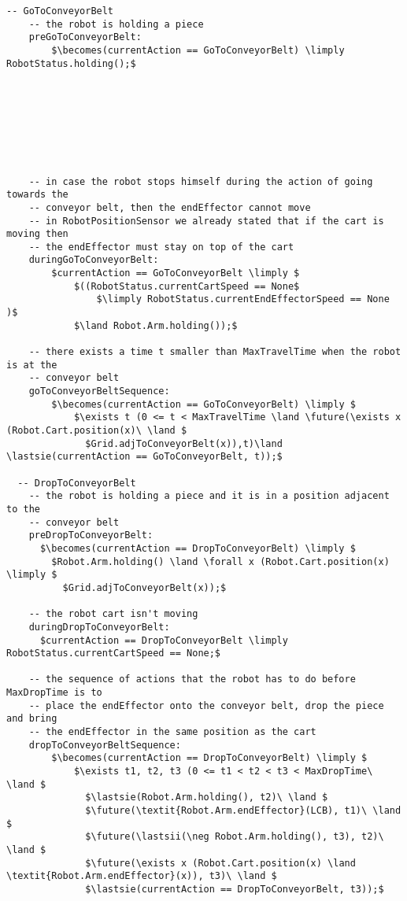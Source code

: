 \begin{lstlisting}[fontadjust, mathescape, frame=single]
  -- GoToConveyorBelt
    -- the robot is holding a piece
    preGoToConveyorBelt:
        $\becomes(currentAction == GoToConveyorBelt) \limply RobotStatus.holding();$
    







    -- in case the robot stops himself during the action of going towards the 
    -- conveyor belt, then the endEffector cannot move 
    -- in RobotPositionSensor we already stated that if the cart is moving then 
    -- the endEffector must stay on top of the cart
    duringGoToConveyorBelt:
        $currentAction == GoToConveyorBelt \limply $
            $((RobotStatus.currentCartSpeed == None$ 
                $\limply RobotStatus.currentEndEffectorSpeed == None )$
            $\land Robot.Arm.holding());$

    -- there exists a time t smaller than MaxTravelTime when the robot is at the 
    -- conveyor belt
    goToConveyorBeltSequence:
        $\becomes(currentAction == GoToConveyorBelt) \limply $
            $\exists t (0 <= t < MaxTravelTime \land \future(\exists x (Robot.Cart.position(x)\ \land $
              $Grid.adjToConveyorBelt(x)),t)\land \lastsie(currentAction == GoToConveyorBelt, t));$
      
  -- DropToConveyorBelt
    -- the robot is holding a piece and it is in a position adjacent to the 
    -- conveyor belt
    preDropToConveyorBelt:
      $\becomes(currentAction == DropToConveyorBelt) \limply $
        $Robot.Arm.holding() \land \forall x (Robot.Cart.position(x) \limply $
          $Grid.adjToConveyorBelt(x));$
    
    -- the robot cart isn't moving
    duringDropToConveyorBelt:
      $currentAction == DropToConveyorBelt \limply RobotStatus.currentCartSpeed == None;$

    -- the sequence of actions that the robot has to do before MaxDropTime is to 
    -- place the endEffector onto the conveyor belt, drop the piece and bring  
    -- the endEffector in the same position as the cart
    dropToConveyorBeltSequence:
        $\becomes(currentAction == DropToConveyorBelt) \limply $
            $\exists t1, t2, t3 (0 <= t1 < t2 < t3 < MaxDropTime\ \land $
              $\lastsie(Robot.Arm.holding(), t2)\ \land $
              $\future(\textit{Robot.Arm.endEffector}(LCB), t1)\ \land $
              $\future(\lastsii(\neg Robot.Arm.holding(), t3), t2)\ \land $
              $\future(\exists x (Robot.Cart.position(x) \land \textit{Robot.Arm.endEffector}(x)), t3)\ \land $
              $\lastsie(currentAction == DropToConveyorBelt, t3));$


\end{lstlisting}
